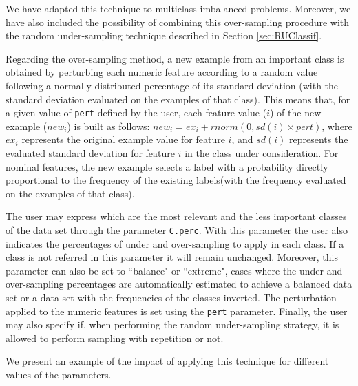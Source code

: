 \documentclass[10pt,a4paper]{article}\usepackage[]{graphicx}\usepackage[]{color}
\begin{document}
We have adapted this technique to multiclass imbalanced problems. Moreover, we have also included the possibility of combining this over-sampling procedure with the random under-sampling technique described in Section \ref{sec:RUClassif}. 

Regarding the over-sampling method, a new example from an important class is obtained by perturbing each numeric feature according to a random value following a normally distributed percentage of its standard deviation (with the standard deviation evaluated on the examples of that class). This means that, for a given value of \texttt{pert} defined by the user, each feature value ($i$) of the new example ($new_i$) is built as follows: $new_i=ex_i+rnorm(0,sd(i)\times pert) $, where $ex_i$ represents the original example value for feature $i$, and $sd(i)$ represents the evaluated standard deviation for feature $i$ in the class under consideration. For nominal features, the new example selects a label with a probability directly proportional to the frequency of the existing labels(with the frequency evaluated on the examples of that class).

The user may express which are the most relevant and the less important classes of the data set through the parameter \texttt{C.perc}. With this parameter the user also indicates the percentages of under and over-sampling to apply in each class. If a class is not referred in this parameter it will remain unchanged. Moreover, this parameter can also be set to ``balance" or ``extreme", cases where the under and over-sampling percentages are automatically estimated to achieve a balanced data set or a data set with the frequencies of the classes inverted. The perturbation applied to the numeric features is set using the \texttt{pert} parameter. Finally, the user may also specify if, when performing the random under-sampling strategy, it is allowed to perform sampling with repetition or not.

We present an example of the impact of applying this technique for different values of the parameters.
\end{document}
